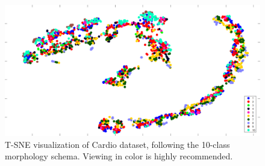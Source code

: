 \begin{figure}
	\centering
	\includegraphics[width=0.9\linewidth]{figures/png/Cardio10TSNE}
	\caption[T-SNE visualization of Cardio dataset, morphology]{T-SNE visualization of Cardio dataset, following the 10-class morphology schema.  Viewing in color is highly recommended.}
	\label{fig:cardio10tsne}
\end{figure}
